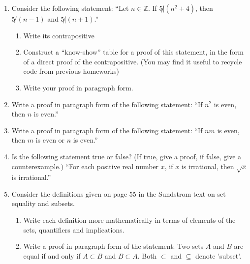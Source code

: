 \documentclass[12pt]{article}
\newcommand{\ZZ}{{\mathbb Z}}
\begin{document}
\begin{enumerate}

 
 \item Consider the following statement:\newline
  ``Let $n\in\ZZ$.   If $5{\not|}(n^2+4)$, then $5{\not|}(n-1)$ and $5{\not|}(n+1)$.''
   \begin{enumerate}
   \item  Write its contrapositive
   \item  Construct a ``know-show'' table for a proof of this statement, in the form of a direct proof of the
     contrapositive.
       (You may find it useful to recycle code from previous homeworks)
   \item  Write your proof in paragraph form.  
  \end{enumerate}


\item Write a proof in paragraph form of the following statement:
 ``If $n^2$ is even, then $n$ is even.''


\item Write a proof in paragraph form of the following statement:
 ``If $nm$ is even, then $m$ is even or $n$ is even.''


  
\item 
  Is the following statement true or false? (If true, give a proof, if false, give a counterexample.)\newline
  ``For each positive real number $x$, if $x$ is irrational, then $\sqrt{x}$ is irrational.''

 \item Consider the definitions given on page 55 in the Sundstrom text on set equality and subsets.
   \begin{enumerate}
   \item  Write each definition more mathematically in terms of elements of the sets, quantifiers and implications.
   \item  Write a proof in paragraph form of the statement: Two sets $A$ and $B$ are equal if and only if $A\subset B$ and
     $B\subset A$.
     {\color{Magenta}Both $\subset$ and $\subseteq$ denote 'subset'.}
  \end{enumerate}


\end{enumerate}
\end{document}
